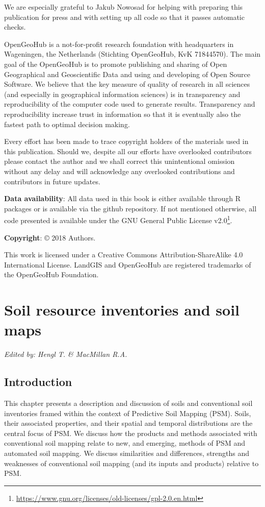 \documentclass[graybox,natbib,nospthms,UStrade]{svmono}
\renewcommand{\href}[2]{#2 (\url{#1})}
\renewcommand{\href}[2]{#2\footnote{\url{#1}}}
\begin{document}
We are especially grateful to Jakub Nowosad for helping with preparing this publication for press and with setting up all code so that it passes automatic checks.

OpenGeoHub is a not-for-profit research foundation with headquarters in Wageningen, the Netherlands (Stichting OpenGeoHub, KvK 71844570). The main goal of the OpenGeoHub is to promote publishing and sharing of Open Geographical and Geoscientific Data and using and developing of Open Source Software. We believe that the key measure of quality of research in all sciences (and especially in geographical information sciences) is in transparency and reproducibility of the computer code used to generate results. Transparency and reproducibility increase trust in information so that it is eventually also the fastest path to optimal decision making.

Every effort has been made to trace copyright holders of the materials used in this publication. Should we, despite all our efforts have overlooked contributors please contact the author and we shall correct this unintentional omission without any delay and will acknowledge any overlooked contributions and contributors in future updates.

\textbf{Data availability}: All data used in this book is either available through R packages or is available via the github repository. If not mentioned otherwise, all code presented is available under the \href{https://www.gnu.org/licenses/old-licenses/gpl-2.0.en.html}{GNU General Public License v2.0}.

\textbf{Copyright}: © 2018 Authors.

This work is licensed under a Creative Commons Attribution-ShareAlike 4.0 International License. LandGIS and OpenGeoHub are registered trademarks of the OpenGeoHub Foundation.

\hypertarget{introduction}{%
\chapter{Soil resource inventories and soil maps}\label{introduction}}

\emph{Edited by: Hengl T. \& MacMillan R.A.}

\hypertarget{introduction-1}{%
\section{Introduction}\label{introduction-1}}

This chapter presents a description and discussion of soils and
conventional soil inventories framed within the context of Predictive Soil Mapping (PSM). Soils,
their associated properties, and their spatial and temporal distributions are the
central focus of PSM. We discuss how the products and
methods associated with conventional soil mapping relate to new, and
emerging, methods of PSM and automated soil mapping. We discuss similarities and
differences, strengths and weaknesses of conventional soil mapping (and
its inputs and products) relative to PSM.
\end{document}

